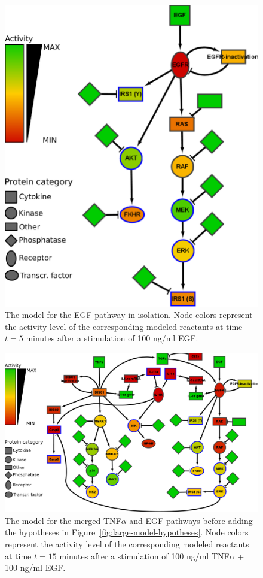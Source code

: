 \begin{figure}[!tpb]
\begin{minipage}{\textwidth}
\centering
  \includegraphics[width=.7\textwidth]{images/large_network_egf3}
\caption{The model for the EGF pathway in isolation. Node colors represent the
activity level of the corresponding modeled reactants at time $t = 5$ minutes after
a stimulation of 100 ng/ml EGF.}\label{fig:large-model-egf}
\end{minipage}
\end{figure}


\begin{figure}[!tpb]
\begin{minipage}{\textwidth}
\centering
  \includegraphics[width=\textwidth]{images/large_network_tnf_egf_merged_no_hyp_bis2}
\caption{The model for the merged TNF$\alpha$ and EGF pathways before
adding the hypotheses in Figure~\ref{fig:large-model-hypotheses}. Node colors represent the
activity level of the corresponding modeled reactants at time $t = 15$ minutes after
a stimulation of 100 ng/ml TNF$\alpha$ + 100 ng/ml EGF.}\label{fig:large-model-tnf-egf-merged}
\end{minipage}
\end{figure}


